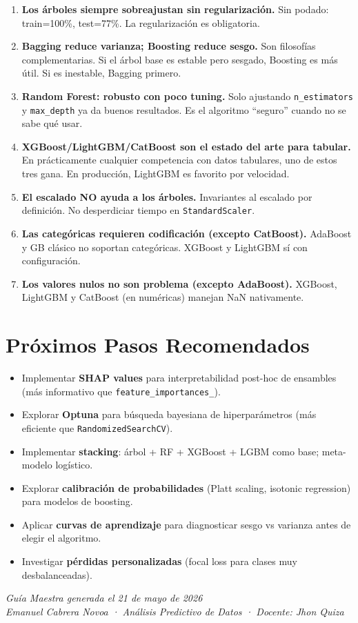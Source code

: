 \documentclass[11pt, a4paper]{book}
\begin{document}
\begin{enumerate}[label=\checkmark, leftmargin=*]
  \item \textbf{Los árboles siempre sobreajustan sin regularización.}
        Sin podado: train=100\%, test=77\%. La regularización es obligatoria.

  \item \textbf{Bagging reduce varianza; Boosting reduce sesgo.}
        Son filosofías complementarias. Si el árbol base es estable pero sesgado,
        Boosting es más útil. Si es inestable, Bagging primero.

  \item \textbf{Random Forest: robusto con poco tuning.}
        Solo ajustando \texttt{n\_estimators} y \texttt{max\_depth} ya da buenos resultados.
        Es el algoritmo ``seguro'' cuando no se sabe qué usar.

  \item \textbf{XGBoost/LightGBM/CatBoost son el estado del arte para tabular.}
        En prácticamente cualquier competencia con datos tabulares, uno de estos tres gana.
        En producción, LightGBM es favorito por velocidad.

  \item \textbf{El escalado NO ayuda a los árboles.}
        Invariantes al escalado por definición. No desperdiciar tiempo en \texttt{StandardScaler}.

  \item \textbf{Las categóricas requieren codificación (excepto CatBoost).}
        AdaBoost y GB clásico no soportan categóricas. XGBoost y LightGBM sí con configuración.

  \item \textbf{Los valores nulos no son problema (excepto AdaBoost).}
        XGBoost, LightGBM y CatBoost (en numéricas) manejan NaN nativamente.
\end{enumerate}

\section{Próximos Pasos Recomendados}

\begin{itemize}
  \item Implementar \textbf{SHAP values} para interpretabilidad post-hoc de ensambles
        (más informativo que \texttt{feature\_importances\_}).
  \item Explorar \textbf{Optuna} para búsqueda bayesiana de hiperparámetros
        (más eficiente que \texttt{RandomizedSearchCV}).
  \item Implementar \textbf{stacking}: árbol + RF + XGBoost + LGBM como base;
        meta-modelo logístico.
  \item Explorar \textbf{calibración de probabilidades} (Platt scaling, isotonic regression)
        para modelos de boosting.
  \item Aplicar \textbf{curvas de aprendizaje} para diagnosticar sesgo vs varianza antes de
        elegir el algoritmo.
  \item Investigar \textbf{pérdidas personalizadas} (focal loss para clases muy desbalanceadas).
\end{itemize}

\vfill
\begin{center}
  \textit{Guía Maestra generada el 21 de mayo de 2026}\\
  \textit{Emanuel Cabrera Novoa · Análisis Predictivo de Datos · Docente: Jhon Quiza}
\end{center}
\end{document}

